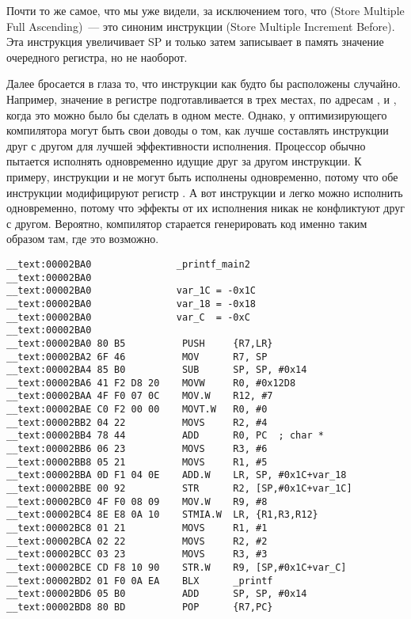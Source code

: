 Почти то же самое, что мы уже видели, за исключением того, что  (Store Multiple Full Ascending)~--- 
это синоним инструкции  (Store Multiple Increment Before). 
Эта инструкция увеличивает \ac{SP} и только затем записывает в память значение очередного регистра, но не наоборот.

Далее бросается в глаза то, что инструкции как будто бы расположены случайно.
Например, значение в регистре  подготавливается в трех местах, по адресам ,  и , 
когда это можно было бы сделать в одном месте.
Однако, у оптимизирующего компилятора могут быть свои доводы о том, как лучше составлять инструкции 
друг с другом для лучшей эффективности исполнения.
Процессор обычно пытается исполнять одновременно идущие друг за другом инструкции.
К примеру, инструкции  и  не могут быть исполнены одновременно,
потому что обе инструкции модифицируют регистр . 
А вот инструкции  и  легко можно исполнить одновременно, 
потому что эффекты от их исполнения никак не конфликтуют друг с другом.
Вероятно, компилятор старается генерировать код именно таким образом там, где это возможно.
 
\myparagraph{\OptimizingXcodeIV: \ThumbTwoMode}

\begin{lstlisting}[style=customasmARM]
__text:00002BA0               _printf_main2
__text:00002BA0
__text:00002BA0               var_1C = -0x1C
__text:00002BA0               var_18 = -0x18
__text:00002BA0               var_C  = -0xC
__text:00002BA0
__text:00002BA0 80 B5          PUSH     {R7,LR}
__text:00002BA2 6F 46          MOV      R7, SP
__text:00002BA4 85 B0          SUB      SP, SP, #0x14
__text:00002BA6 41 F2 D8 20    MOVW     R0, #0x12D8
__text:00002BAA 4F F0 07 0C    MOV.W    R12, #7
__text:00002BAE C0 F2 00 00    MOVT.W   R0, #0
__text:00002BB2 04 22          MOVS     R2, #4
__text:00002BB4 78 44          ADD      R0, PC  ; char *
__text:00002BB6 06 23          MOVS     R3, #6
__text:00002BB8 05 21          MOVS     R1, #5
__text:00002BBA 0D F1 04 0E    ADD.W    LR, SP, #0x1C+var_18
__text:00002BBE 00 92          STR      R2, [SP,#0x1C+var_1C]
__text:00002BC0 4F F0 08 09    MOV.W    R9, #8
__text:00002BC4 8E E8 0A 10    STMIA.W  LR, {R1,R3,R12}
__text:00002BC8 01 21          MOVS     R1, #1
__text:00002BCA 02 22          MOVS     R2, #2
__text:00002BCC 03 23          MOVS     R3, #3
__text:00002BCE CD F8 10 90    STR.W    R9, [SP,#0x1C+var_C]
__text:00002BD2 01 F0 0A EA    BLX      _printf
__text:00002BD6 05 B0          ADD      SP, SP, #0x14
__text:00002BD8 80 BD          POP      {R7,PC}
\end{lstlisting}

